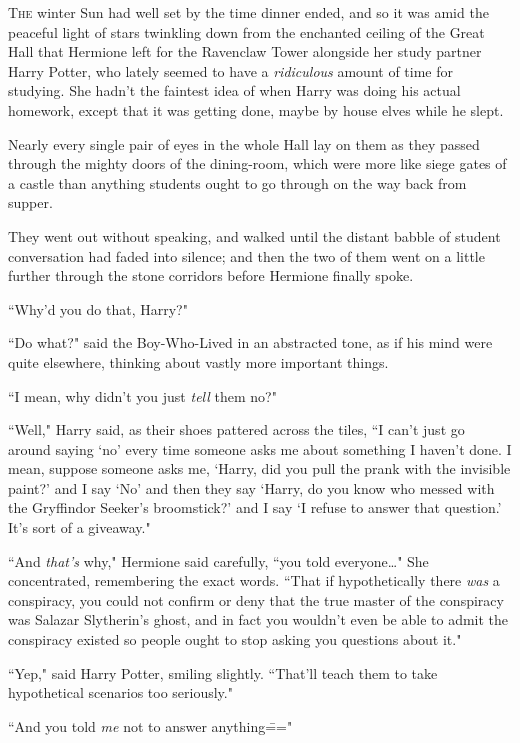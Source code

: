 
\lettrine{T}{he} winter Sun had well set by the time dinner ended, and so it was amid the peaceful light of stars twinkling down from the enchanted ceiling of the Great Hall that Hermione left for the Ravenclaw Tower alongside her study partner Harry Potter, who lately seemed to have a \emph{ridiculous} amount of time for studying. She hadn't the faintest idea of when Harry was doing his actual homework, except that it was getting done, maybe by house elves while he slept.

Nearly every single pair of eyes in the whole Hall lay on them as they passed through the mighty doors of the dining-room, which were more like siege gates of a castle than anything students ought to go through on the way back from supper.

They went out without speaking, and walked until the distant babble of student conversation had faded into silence; and then the two of them went on a little further through the stone corridors before Hermione finally spoke.

``Why'd you do that, Harry?"

``Do what?" said the Boy-Who-Lived in an abstracted tone, as if his mind were quite elsewhere, thinking about vastly more important things.

``I mean, why didn't you just \emph{tell} them no?"

``Well," Harry said, as their shoes pattered across the tiles, ``I can't just go around saying `no' every time someone asks me about something I haven't done. I mean, suppose someone asks me, `Harry, did you pull the prank with the invisible paint?' and I say `No' and then they say `Harry, do you know who messed with the Gryffindor Seeker's broomstick?' and I say `I refuse to answer that question.' It's sort of a giveaway."

``And \emph{that's} why," Hermione said carefully, ``you told everyone{\ldots}" She concentrated, remembering the exact words. ``That if hypothetically there \emph{was} a conspiracy, you could not confirm or deny that the true master of the conspiracy was Salazar Slytherin's ghost, and in fact you wouldn't even be able to admit the conspiracy existed so people ought to stop asking you questions about it."

``Yep," said Harry Potter, smiling slightly. ``That'll teach them to take hypothetical scenarios too seriously."

``And you told \emph{me} not to answer anything\==="

